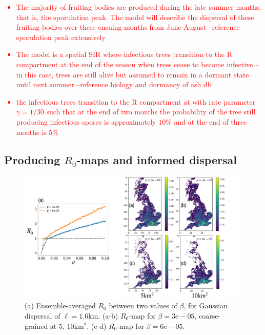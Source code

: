 \textcolor{red}{
\begin{itemize}
    \item The majority of fruiting bodies are produced during the late summer months, that is, the sporulation peak. The model will describe the dispersal of these fruiting bodies over these ensuing months from June-August --reference sporulation peak extensively
    \item The model is a spatial SIR where infectious trees transition to the R compartment at the end of the season when trees cease to become infective -- in this case, trees are still alive but assumed to remain in a dormant state until next summer --reference biology and dormancy of ash db
    \item the infectious trees transition to the R compartment at with rate parameter $\gamma = 1/30$ such that at the end of two months the probability of the tree still producing infectious spores is approximately $10\%$ and at the end of three months is $5\%$
\end{itemize}
}

\subsection{Producing $R_0$-maps and informed dispersal}

\begin{figure}
    \centering
    \includegraphics[scale=0.25]{chapter5/figures_/fig3.pdf}
      \caption{(a) Ensemble-averaged $R_0$ between two values of $\beta$, for Gaussian dispersal of $\ell=1.6\mathrm{km}$. (a-b) $R_0$-map for $\beta=3\mathrm{e}-05$, coarse-grained at $5$, $ 10\mathrm{km^2}$. (c-d) $R_0$-map for $\beta=6\mathrm{e}-05$.}
    \label{fig:mapping-R0-onto-density}
\end{figure}

